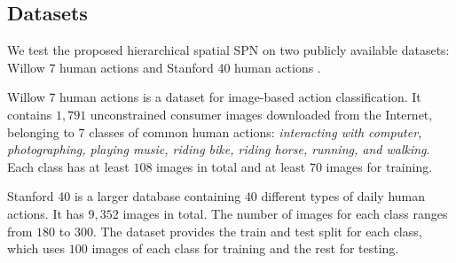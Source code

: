 \documentclass[journal]{IEEEtran}
\begin{document}
\subsection{Datasets}


We test the proposed hierarchical spatial SPN on two publicly available datasets: Willow 7 human actions \cite{Delaitre10recognizinghuman} and Stanford 40 human actions \cite{Yao11humanaction__Stanford40}.


Willow 7 human actions \cite{Delaitre10recognizinghuman} is a dataset for image-based action classification. It contains $ 1,791 $ unconstrained consumer images downloaded from the Internet, belonging to $ 7 $ classes of common human actions: \textit{interacting with computer, photographing, playing music, riding bike, riding horse, running, and walking}. Each class has at least $ 108 $ images in total and at least $ 70 $ images for training.


Stanford 40 \cite{Yao11humanaction__Stanford40} is a larger database containing $ 40 $ different types of daily human actions. It has $ 9,352 $ images in total. The number of images for each class ranges from $ 180 $ to $ 300 $. The dataset provides the train and test split for each class, which uses $ 100 $ images of each class for training and the rest for testing.
\end{document}
